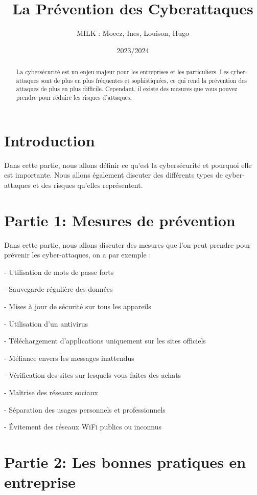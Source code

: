 \documentclass[a4paper,11pt]{article}
\title{La Prévention des Cyberattaques}
\author{MILK : Moeez, Ines, Louison, Hugo}
\date{2023/2024}
\begin{document}
\maketitle

\begin{abstract}
  La cybersécurité est un enjeu majeur pour les entreprises et les particuliers. 
  Les cyber-attaques sont de plus en plus fréquentes et sophistiquées, ce qui rend la prévention des attaques de plus en plus difficile. 
  Cependant, il existe des mesures que vous pouvez prendre pour réduire les risques d’attaques.
\end{abstract}


\section{Introduction}

Dans cette partie, nous allons définir ce qu’est la cybersécurité et pourquoi elle est importante. 
Nous allons également discuter des différents types de cyber-attaques et des risques qu’elles représentent.


\section{Partie 1: Mesures de prévention}

Dans cette partie, nous allons discuter des mesures que l’on peut prendre pour prévenir les cyber-attaques, on a par exemple : 

  - Utilisation de mots de passe forts

  - Sauvegarde régulière des données

  - Mises à jour de sécurité sur tous les appareils

  - Utilisation d’un antivirus

  - Téléchargement d’applications uniquement sur les sites officiels

  - Méfiance envers les messages inattendus

  - Vérification des sites sur lesquels vous faites des achats

  - Maîtrise des réseaux sociaux

  - Séparation des usages personnels et professionnels

  - Évitement des réseaux WiFi publics ou inconnus


\section{Partie 2: Les bonnes pratiques en entreprise}
\end{document}
